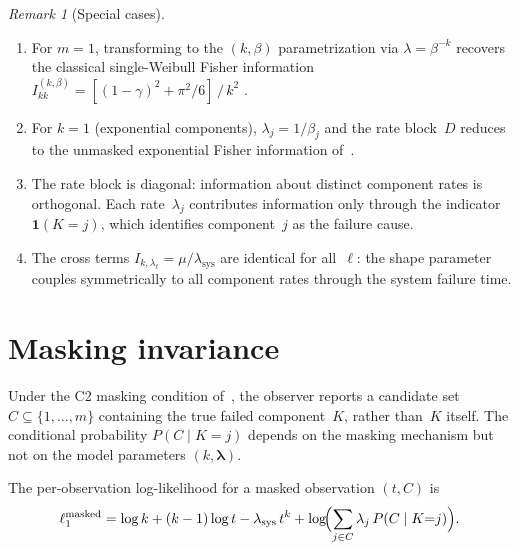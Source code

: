 \documentclass[12pt]{article}
\theoremstyle{remark}
\newtheorem{remark}{Remark}
\newcommand{\lsys}{\lambda_{\mathrm{sys}}}
\newcommand{\ind}{\mathbf{1}}
\begin{document}
\begin{remark}[Special cases]\label{rem:special}
\begin{enumerate}
\item[\textup{(i)}]
For $m = 1$, transforming to the $(k, \beta)$ parametrization via
$\lambda = \beta^{-k}$ recovers the classical single-Weibull Fisher
information
$I_{kk}^{(k,\beta)} = [(1-\gamma)^2 + \pi^2/6]\,/\,k^2$
\citep{lawless2003}.

\item[\textup{(ii)}]
For $k = 1$ (exponential components), $\lambda_j = 1/\beta_j$ and the
rate block~$D$ reduces to the unmasked exponential Fisher information
of~\citet{towell2026exponential}.

\item[\textup{(iii)}]
The rate block is diagonal: information about distinct component rates is
orthogonal.  Each rate~$\lambda_j$ contributes information only through
the indicator $\ind(K{=}j)$, which identifies component~$j$ as the
failure cause.

\item[\textup{(iv)}]
The cross terms $I_{k,\lambda_\ell} = \mu/\lsys$ are identical for
all~$\ell$: the shape parameter couples symmetrically to all component
rates through the system failure time.
\end{enumerate}
\end{remark}


\section{Masking invariance}\label{sec:masking}

Under the C2 masking condition of~\citet{towell2025masked}, the observer
reports a candidate set $C \subseteq \{1, \ldots, m\}$ containing the
true failed component~$K$, rather than~$K$ itself.  The conditional
probability $P(C \mid K{=}j)$ depends on the masking mechanism but not
on the model parameters $(k, \bm{\lambda})$.

The per-observation log-likelihood for a masked observation $(t, C)$ is
%
\begin{equation}\label{eq:loglik_masked}
\ell_1^{\mathrm{masked}}
= \log k + (k-1)\log t - \lsys\,t^k
  + \log\!\Bigl(\sum_{j \in C} \lambda_j\,P(C \mid K{=}j)\Bigr).
\end{equation}
\end{document}
